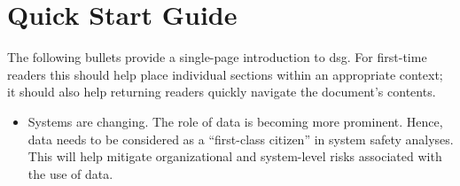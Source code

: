 \clearpage
\section*{Quick Start Guide}
\pagestyle{ContinuationPageFrontMatter}


The following bullets provide a single-page introduction to \gls{dsg}. For first-time readers this should help place individual sections within an appropriate context; it should also help returning readers quickly navigate the document's contents.

\begin{itemize}
  \item Systems are changing. The role of data is becoming more prominent. Hence, data needs to be considered as a ``first-class citizen'' in system safety analyses. This will help mitigate organizational and system-level risks associated with the use of data.


\end{itemize}
